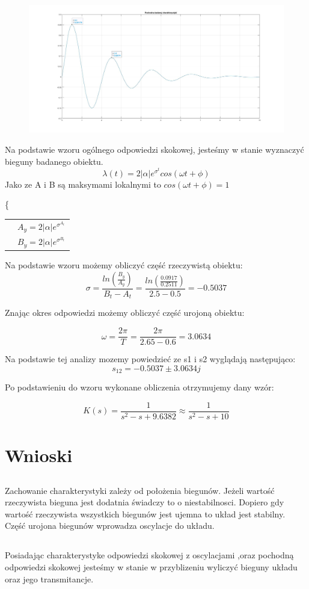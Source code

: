 \documentclass{article}
\begin{document}
\begin{figure}
    \centering
    \includegraphics[width=13cm]{odpimp.jpg}
\end{figure}

Na podstawie wzoru ogólnego odpowiedzi skokowej, jesteśmy w stanie wyznaczyć bieguny badanego obiektu.
$$
    \lambda(t) = 2|\alpha|e^\sigma^t cos(\omega t + \phi)  
$$
Jako ze A i B są maksymami lokalnymi to $cos(\omega t + \phi) = 1$

\centering
\bigg\{
\begin{tabular}{cc}
          & $ A_y = 2|\alpha|e^\sigma^{A_t} $ \\
          & $B_y = 2|\alpha|e^\sigma^{B_t}$
\end{tabular}

\raggedright

Na podstawie wzoru możemy obliczyć część rzeczywistą obiektu:
$$
\sigma = \frac{ln(\frac{B_y}{A_y})}{B_t-A_t}=\frac{ln(\frac{0.0917}{0.2511})}{2.5-0.5} = -0.5037
$$

Znając okres odpowiedzi  możemy obliczyć część urojoną obiektu:

$$
\omega = \frac{2\pi}{T} = \frac{2\pi}{2.65-0.6} = 3.0634
$$

Na podstawie tej analizy mozemy powiedzieć ze s1 i s2 wyglądają następująco:
$$
    s_{12}= -0.5037\pm 3.0634j
$$

Po podstawieniu do wzoru wykonane obliczenia otrzymujemy dany wzór:

$$
 K(s) =\frac{1}{s^2-s+9.6382} \approx  \frac{1}{s^2-s+10}
$$
\newpage
\section{Wnioski}
\subsection{}
Zachowanie charakterystyki zależy od położenia biegunów. Jeżeli wartość rzeczywista bieguna jest dodatnia świadczy to o niestabilnosci. Dopiero gdy wartość rzeczywista wszystkich biegunów jest ujemna to układ jest stabilny. Część urojona biegunów wprowadza oscylacje do układu.
\subsection{}
Posiadając charakterystyke odpowiedzi skokowej z oscylacjami ,oraz pochodną odpowiedzi skokowej jesteśmy w stanie w przyblizeniu wyliczyć bieguny układu oraz jego transmitancje.
\end{document}
